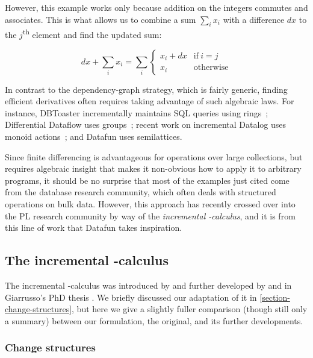 However, this example works only because addition on the integers commutes and
associates. This is what allows us to combine a sum $\sum_i x_i$ with a
difference $dx$ to the $j$\textsuperscript{th} element and find the updated sum:

\[
dx + \sum_i x_i = \sum_i 
\begin{cases}
  x_i + dx & \text{if}~i = j\\
  x_i & \text{otherwise}
\end{cases}
\]

\noindent
In contrast to the dependency-graph strategy, which is fairly generic, finding
efficient derivatives often requires taking advantage of such algebraic laws.
%
For instance, DBToaster incrementally maintains SQL queries using
rings~\citep{DBLP:conf/pods/Koch10,Koch:183766}; Differential Dataflow uses
groups~\citep{DBLP:conf/cidr/McSherryMII13}; recent work on incremental Datalog
uses monoid actions~\citep{DBLP:conf/esop/Alvarez-Picallo19}; and Datafun uses
semilattices.
%

Since finite differencing is advantageous for operations over large collections,
but requires algebraic insight that makes it non-obvious how to apply it to
arbitrary programs, it should be no surprise that most of the examples just
cited come from the database research community, which often deals with
structured operations on bulk data.
%
However, this approach has recently crossed over into the PL research community
by way of the \emph{incremental \fn-calculus}, and it is from this line of work
that Datafun takes inspiration.


\subsection{The incremental \boldfn-calculus}
\label{section-incremental-lambda-calculus}

The incremental \fn-calculus was introduced by \citet*{incremental} and further
developed by \citet*{DBLP:conf/esop/GiarrussoRS19} and in Giarrusso's PhD thesis
\citeyearpar{DBLP:phd/dnb/Giarrusso20}.
%
We briefly discussed our adaptation of it in \cref{section-change-structures},
but here we give a slightly fuller comparison (though still only a summary)
between our formulation, the original, and its further developments.


\subsubsection{Change structures}

